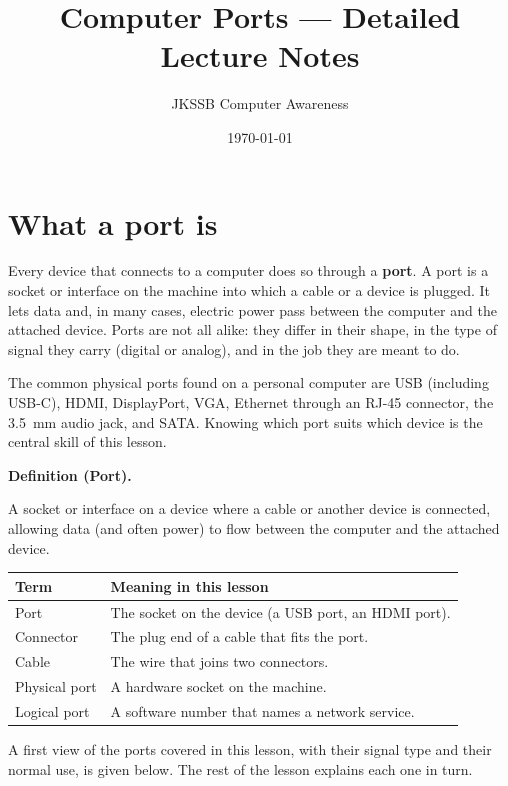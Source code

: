\documentclass[11pt]{article}
\title{Computer Ports --- Detailed Lecture Notes}
\author{JKSSB Computer Awareness}
\date{\today}
\newenvironment{definitionbox}[1]{%
  \par\noindent\textbf{Definition (#1).}\ \itshape
}{\par\vspace{0.3em}}
\begin{document}
\maketitle

\section{What a port is}
Every device that connects to a computer does so through a \textbf{port}. A
port is a socket or interface on the machine into which a cable or a device
is plugged. It lets data and, in many cases, electric power pass between the
computer and the attached device. Ports are not all alike: they differ in
their shape, in the type of signal they carry (digital or analog), and in the
job they are meant to do.

The common physical ports found on a personal computer are USB (including
USB-C), HDMI, DisplayPort, VGA, Ethernet through an RJ-45 connector, the
3.5~mm audio jack, and SATA. Knowing which port suits which device is the
central skill of this lesson.

\begin{definitionbox}{Port}
A socket or interface on a device where a cable or another device is
connected, allowing data (and often power) to flow between the computer and
the attached device.
\end{definitionbox}

\begin{center}
\begin{tabular}{p{}p{}}
\toprule
\textbf{Term} & \textbf{Meaning in this lesson} \\
\midrule
Port & The socket on the device (a USB port, an HDMI port). \\
Connector & The plug end of a cable that fits the port. \\
Cable & The wire that joins two connectors. \\
Physical port & A hardware socket on the machine. \\
Logical port & A software number that names a network service. \\
\bottomrule
\end{tabular}
\end{center}

A first view of the ports covered in this lesson, with their signal type and
their normal use, is given below. The rest of the lesson explains each one in
turn.
\end{document}
